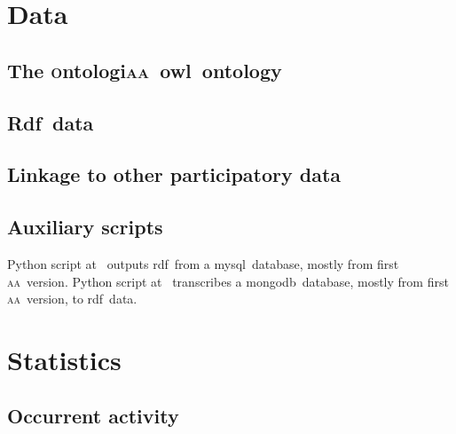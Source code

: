 \documentclass[a4paper, 11pt]{article} %
\newcommand{\aab}{\textsc{aa}}
\newcommand{\ontologiaa}{\textsc{o}ntologi\textsc{aa}}
\newcommand{\owl}{{\sc owl}}
\newcommand{\rdfi}{{\sc Rdf}}
\newcommand{\mongodb}{{\sc m}ongo{\sc db}}
\newcommand{\mysql}{{\sc m}y{\sc sql}}
\newcommand{\rdf}{{\sc rdf}}
\begin{document}
\section{Data}\label{sec:data}
\subsection{The \ontologiaa\ \owl\ ontology}

\subsection{\rdfi\ data}

\subsection{Linkage to other participatory data}

\subsection{Auxiliary scripts}
Python script at~\cite{mysqlTri} outputs \rdf\ from a \mysql\ database, mostly from first \aab\ version.
Python script at~\cite{mongoTri} transcribes a \mongodb\ database, mostly from first \aab\ version, to \rdf\ data.


\section{Statistics}\label{sec:stats}
\subsection{Occurrent activity}
\end{document}
